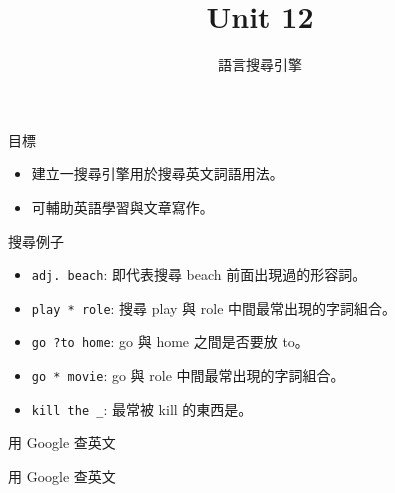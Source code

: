 \documentclass[12pt,c]{beamer}
\title{Unit 12}
\subtitle{語言搜尋引擎}
\begin{document}
\begin{frame}
  \titlepage
\end{frame}

\begin{frame}{目標}
  \begin{itemize}
  \item 建立一搜尋引擎用於搜尋英文詞語用法。
  \item 可輔助英語學習與文章寫作。
  \end{itemize}

  \begin{block}{搜尋例子}
    \begin{itemize}
    \item \lstinline|adj. beach|: 即代表搜尋 beach 前面出現過的形容詞。
    \item \lstinline|play * role|: 搜尋 play 與 role 中間最常出現的字詞組合。
    \item \lstinline|go ?to home|: go 與 home 之間是否要放 to。
    \item \lstinline|go * movie|: go 與 role 中間最常出現的字詞組合。 
    \item \lstinline|kill the _|: 最常被 kill 的東西是。
    \end{itemize}
  \end{block}
\end{frame}

\begin{frame}[t,plain]{用 Google 查英文}
\end{frame}

\begin{frame}[t,plain]{用 Google 查英文}
\end{frame}
\end{document}
